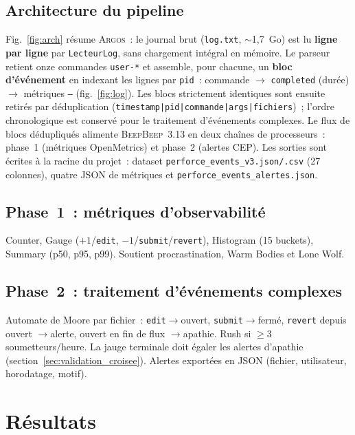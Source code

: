 \documentclass[conference]{IEEEtran}
\newcommand{\toolname}{\textsc{Argos}}
\newcommand{\beepbeep}{\textsc{BeepBeep}}
\begin{document}
\subsection{Architecture du pipeline}
Fig.~\ref{fig:arch} résume \toolname{}~: le journal brut
(\texttt{log.txt}, ${\sim}$1,7~Go) est lu \textbf{ligne par ligne} par
\texttt{LecteurLog}, sans chargement intégral en mémoire. Le parseur
retient onze commandes \texttt{user-*} et assemble, pour chacune, un
\textbf{bloc d'événement} en indexant les lignes par \texttt{pid}~:
commande $\rightarrow$ \texttt{completed} (durée) $\rightarrow$ métriques
\texttt{---} (fig.~\ref{fig:log}). Les blocs strictement identiques sont
ensuite retirés par déduplication
(\texttt{timestamp|pid|commande|args|fichiers})~; l'ordre chronologique
est conservé pour le traitement d'événements complexes. Le flux de blocs
dédupliqués alimente \beepbeep{}~3.13 en deux chaînes de processeurs~:
phase~1 (métriques OpenMetrics) et phase~2 (alertes CEP). Les sorties
sont écrites à la racine du projet~: dataset
\texttt{perforce\_events\_v3.json/.csv} (27 colonnes), quatre JSON de
métriques et \texttt{perforce\_events\_alertes.json}.

\figZeroArchitecture

\subsection{Phase~1~: m\'etriques d'observabilit\'e}
Counter, Gauge ($+1$/\texttt{edit}, $-1$/\texttt{submit}/\texttt{revert}),
Histogram (15 buckets), Summary (p50, p95, p99). Soutient procrastination,
Warm Bodies et Lone Wolf.

\subsection{Phase~2~: traitement d'\'ev\'enements complexes}
Automate de Moore par fichier~: \texttt{edit}$\rightarrow$ouvert,
\texttt{submit}$\rightarrow$fermé, \texttt{revert} depuis ouvert
$\rightarrow$alerte, ouvert en fin de flux $\rightarrow$apathie. Rush si
$\geq 3$ soumetteurs/heure. La jauge terminale doit égaler les alertes
d'apathie (section~\ref{sec:validation_croisee}). Alertes exportées en
JSON (fichier, utilisateur, horodatage, motif).

\section{R\'esultats}
\label{sec:resultats}
\end{document}

